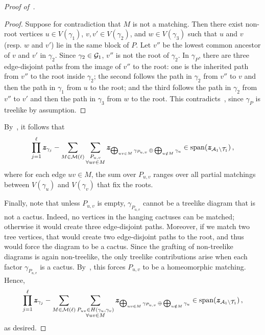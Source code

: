 \begin{proof}[Proof of~]
    \begin{proof}
        Suppose for contradiction that $M$ is not a matching. Then there exist
        non-root vertices $u\in V(\gamma_1)$, $v,v'\in V(\gamma_2)$, and
        $w\in V(\gamma_3)$ such that $u$ and $v$ (resp. $w$ and $v'$) lie in the same block of $P$. Let $v''$ be the lowest common
        ancestor of $v$ and $v'$ in $\gamma_2$. Since $\gamma_2\in{\cal G}_1$, $v''$ is
        not the root of $\gamma_2$. In ${\gamma_P}$, there are three edge-disjoint paths from the image of
        $v''$ to the root: one is the inherited path from $v''$ to the root inside
        $\gamma_2$; the second follows the path in $\gamma_2$ from $v''$ to $v$ and
        then the path in $\gamma_1$ from $u$ to the root; and the third follows the
        path in $\gamma_2$ from $v''$ to $v'$ and then the path in $\gamma_3$ from
        $w$ to the root. This contradicts~, since
        ${\gamma_P}$ is treelike by assumption.
    \end{proof}

    By~, it follows that
    \[
        \prod_{j=1}^\ell {\bm z}_{\gamma_j} - \sum_{M\in{\cal M}(\ell)} \sum_{\substack{P_{u,v}\\\forall  uv\in M}} {\bm z}_{\bigoplus_{uv\in M}\gamma_{P_{u,v}} \,\oplus\, \bigoplus_{u\notin M} \gamma_u}\in \operatorname{span}({\bm z}_{{\cal A}_1\setminus {\cal T}_1})\,,
    \]
    where for each edge $uv\in M$, the sum over $P_{u,v}$ ranges over all partial
    matchings between $V(\gamma_u)$ and $V(\gamma_v)$ that fix the roots.


    Finally, note that unless $P_{u,v}$ is empty, ${\gamma_{P_{u,v}}}$ cannot
    be a treelike diagram that is not a cactus. Indeed, no vertices in the
    hanging cactuses can be matched; otherwise it would create three edge-disjoint paths. Moreover, if we
    match two tree vertices, that would
    create two edge-disjoint paths to the root, and thus would force the diagram to
    be a cactus.
    Since the grafting of non-treelike diagrams is again non-treelike, the only treelike contributions arise when each factor
    ${\gamma_{P_{u,v}}}$ is a cactus. By~, this forces
    $P_{u,v}$ to be a homeomorphic matching. Hence,
    \[
        \prod_{j=1}^\ell {\bm z}_{\gamma_j} - \sum_{M\in{\cal M}(\ell)} \sum_{\substack{P_{uv}\in H(\gamma_u,\gamma_v)\\\forall uv\in M}} {\bm z}_{\bigoplus_{uv\in M}\gamma_{P_{u,v}} \,\oplus\, \bigoplus_{u\notin M} \gamma_u} \in \operatorname{span}({\bm z}_{{\cal A}_1\setminus {\cal T}_1})\,,
    \]
    as desired.
\end{proof}

